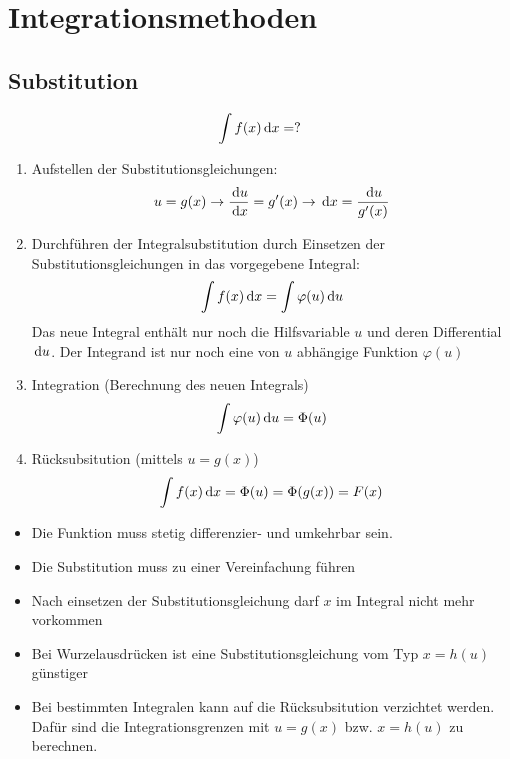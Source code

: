 \section{Integrationsmethoden}
\subsection{Substitution}
\begin{equation*}
	\int f(x) \,\mathrm dx = ?
\end{equation*}

\begin{enumerate}\itemsep0em
	\item Aufstellen der Substitutionsgleichungen:
	\begin{equation*}
		u = g(x) \rightarrow \frac{\,\mathrm du}{\,\mathrm dx} = g'(x) \rightarrow \,\mathrm dx = \frac{\,\mathrm du}{g'(x)}
	\end{equation*}
	\item Durchführen der Integralsubstitution durch Einsetzen der Substitutionsgleichungen in das vorgegebene Integral:
	\begin{equation*}
		\int f(x) \,\mathrm dx = \int \varphi(u) \,\mathrm du
	\end{equation*}
	Das neue Integral enthält nur noch die Hilfsvariable $u$ und deren Differential $\,\mathrm du$. Der Integrand
	ist nur noch eine von $u$ abhängige Funktion $\varphi(u)$
	\item Integration (Berechnung des neuen Integrals)
	\begin{equation*}
		\int \varphi(u) \,\mathrm du = \Phi(u)
	\end{equation*}
	\item Rücksubsitution (mittels $u = g(x)$)
	\begin{equation*}
		\int f(x) \,\mathrm dx = \Phi(u) = \Phi(g(x)) = F(x)
	\end{equation*}
\end{enumerate}
\begin{itemize}
	\item Die Funktion muss stetig differenzier- und umkehrbar sein.
	\item Die Substitution muss zu einer Vereinfachung führen
	\item Nach einsetzen der Substitutionsgleichung darf $x$ im Integral nicht mehr vorkommen
	\item Bei Wurzelausdrücken ist eine Substitutionsgleichung vom Typ $x = h(u)$ günstiger
	\item Bei bestimmten Integralen kann auf die Rücksubsitution verzichtet werden. 
	Dafür sind die Integrationsgrenzen mit $u = g(x)$ bzw. $x = h(u)$ zu berechnen.
\end{itemize}


